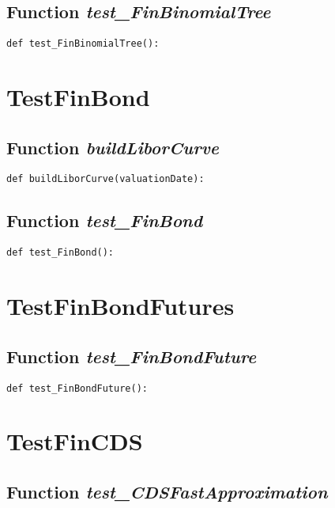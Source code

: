 \documentclass[twoside,11pt]{book}
\begin{document}
\subsection{Function {\it test\_FinBinomialTree}}


\begin{lstlisting}
def test_FinBinomialTree():
\end{lstlisting}


\newpage
\section{TestFinBond}

\subsection{Function {\it buildLiborCurve}}


\begin{lstlisting}
def buildLiborCurve(valuationDate):
\end{lstlisting}

\subsection{Function {\it test\_FinBond}}


\begin{lstlisting}
def test_FinBond():
\end{lstlisting}


\newpage
\section{TestFinBondFutures}

\subsection{Function {\it test\_FinBondFuture}}


\begin{lstlisting}
def test_FinBondFuture():
\end{lstlisting}


\newpage
\section{TestFinCDS}

\subsection{Function {\it test\_CDSFastApproximation}}
\end{document}
